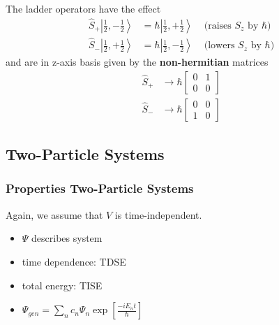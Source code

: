 The ladder operators have the effect
\begin{align*}
    \widehat{S}_{+}\left|\frac{1}{2},-\frac{1}{2}\right> & =\hbar\left|\frac{1}{2},+\frac{1}{2}\right> & \text{ (raises $S_z$ by $\hbar$)} \\
    \widehat{S}_{-}\left|\frac{1}{2},+\frac{1}{2}\right> & =\hbar\left|\frac{1}{2},-\frac{1}{2}\right> & \text{ (lowers $S_z$ by $\hbar$)}
\end{align*}
and are in z-axis basis given by the \textbf{non-hermitian} matrices
\begin{align*}
    \widehat{S}_{+} & \rightarrow \hbar\begin{bmatrix}
                                           0 & 1 \\
                                           0 & 0
                                       \end{bmatrix} \\
    \widehat{S}_{-} & \rightarrow \hbar\begin{bmatrix}
                                           0 & 0 \\
                                           1 & 0
                                       \end{bmatrix}
\end{align*}

\subsection{Two-Particle Systems}
\subsubsection{Properties Two-Particle Systems}
Again, we assume that $V$ is time-independent.

\newpar{}

\begin{itemize}
    \item $\Psi$ describes system
    \item time dependence: TDSE
    \item total energy: TISE
    \item $\Psi_{gen}=\sum_{n} c_{n} \Psi_{n} \exp\left[\frac{-i E_{n} t}{\hbar}\right]$
\end{itemize}

